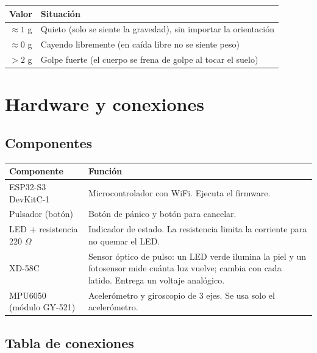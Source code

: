 \documentclass[11pt,a4paper]{article}
\begin{document}
\begin{center}
\begin{tabular}{@{}cl@{}}
\toprule
\textbf{Valor} & \textbf{Situación}\\
\midrule
$\approx 1$ g & Quieto (solo se siente la gravedad), sin importar la orientación\\
$\approx 0$ g & Cayendo libremente (en caída libre no se siente peso)\\
$> 2$ g & Golpe fuerte (el cuerpo se frena de golpe al tocar el suelo)\\
\bottomrule
\end{tabular}
\end{center}

\section{Hardware y conexiones}

\subsection{Componentes}

\begin{center}
\begin{tabular}{@{}l p{10.2cm}@{}}
\toprule
\textbf{Componente} & \textbf{Función}\\
\midrule
ESP32-S3 DevKitC-1 & Microcontrolador con WiFi. Ejecuta el firmware.\\
Pulsador (botón) & Botón de pánico y botón para cancelar.\\
LED + resistencia 220 $\Omega$ & Indicador de estado. La resistencia limita la corriente para no quemar el LED.\\
XD-58C & Sensor óptico de pulso: un LED verde ilumina la piel y un fotosensor mide cuánta luz vuelve; cambia con cada latido. Entrega un voltaje analógico.\\
MPU6050 (módulo GY-521) & Acelerómetro y giroscopio de 3 ejes. Se usa solo el acelerómetro.\\
\bottomrule
\end{tabular}
\end{center}

\subsection{Tabla de conexiones}
\end{document}
